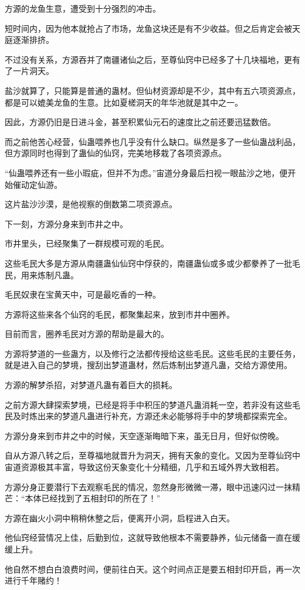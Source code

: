 \begin{this_body}
方源的龙鱼生意，遭受到十分强烈的冲击。

短时间内，因为他本就抢占了市场，龙鱼这块还是有不少收益。但之后肯定会被天庭逐渐排挤。

不过没有关系，方源吞并了南疆诸仙之后，至尊仙窍中已经多了十几块福地，更有了一片洞天。

盐沙就算了，只能算是普通的蛊材。但仙材资源却是不少，其中有五六项资源点，都是可以媲美龙鱼的生意。比如夏槎洞天的年华池就是其中之一。

因此，方源仍旧是日进斗金，甚至积累仙元石的速度比之前还要迅猛数倍。

而之前他苦心经营，仙蛊喂养也几乎没有什么缺口。纵然是多了一些仙蛊战利品，但方源同时也得到了蛊仙的仙窍，完美地移栽了各项资源点。

“仙蛊喂养还有一些小瑕疵，但并不为虑。”宙道分身最后扫视一眼盐沙之地，便开始催动定仙游。

这片盐沙沙漠，是他视察的倒数第二项资源点。

下一刻，方源分身来到市井之中。

市井里头，已经聚集了一群规模可观的毛民。

这些毛民大多是方源从南疆蛊仙仙窍中俘获的，南疆蛊仙或多或少都豢养了一批毛民，用来炼制凡蛊。

毛民奴隶在宝黄天中，可是最吃香的一种。

方源将这些来各个仙窍的毛民，都聚集起来，放到市井中圈养。

目前而言，圈养毛民对方源的帮助是最大的。

方源将梦道的一些蛊方，以及修行之法都传授给这些毛民。这些毛民的主要任务，就是进入自己的梦境，搜刮出梦道蛊材，然后炼制出梦道凡蛊，交给方源使用。

方源的解梦杀招，对梦道凡蛊有着巨大的损耗。

之前方源大肆探索梦境，已经是将手中积压的梦道凡蛊消耗一空，若非没有这些毛民及时炼出来的梦道凡蛊进行补充，方源还未必能够将手中的梦境都探索完全。

方源分身来到市井之中的时候，天空逐渐晦暗下来，虽无日月，但好似傍晚。

自从方源八转之后，至尊福地就晋升为洞天，拥有天象的变化。又因为至尊仙窍中宙道资源极其丰富，导致这份天象变化十分精细，几乎和五域外界大致相若。

方源分身正要潜行下去观察毛民的情况，忽然身形微微一滞，眼中迅速闪过一抹精芒：“本体已经找到了五相封印的所在了！”

方源在幽火小洞中稍稍休整之后，便离开小洞，启程进入白天。

他仙窍经营情况上佳，后勤到位，这就导致他根本不需要静养，仙元储备一直在缓缓上升。

他自然不想白白浪费时间，便前往白天。这个时间点正是要五相封印开启，再一次进行千年赌约！

\end{this_body}

